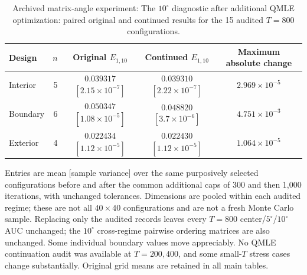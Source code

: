 \documentclass[12pt,letterpaper]{article}
\def\spacingset#1{\renewcommand{\baselinestretch}{#1}\small\normalsize}
\theoremstyle{plain}
\theoremstyle{definition}
\begin{document}
\begin{table}[p]
\begingroup
\spacingset{1.08}
\centering
\caption{Archived matrix-angle experiment: The $10^\circ$ diagnostic after additional QMLE optimization: paired original and continued results for the 15 audited $T=800$ configurations.}
\label{s23:tab:cap_iteration}
\small
\setlength{\tabcolsep}{6pt}
\renewcommand{\arraystretch}{1.10}
\begin{adjustbox}{max width=\linewidth}
\begin{tabular}{lrccc}
\toprule
Design & $n$ & Original $E_{1,10}$ & Continued $E_{1,10}$ & Maximum absolute change\\
\midrule
Interior & 5 & \shortstack{$0.039317$\\{\scriptsize$[2.15\times10^{-7}]$}} & \shortstack{$0.039310$\\{\scriptsize$[2.22\times10^{-7}]$}} & $2.969\times10^{-5}$\\
Boundary & 6 & \shortstack{$0.050347$\\{\scriptsize$[1.08\times10^{-5}]$}} & \shortstack{$0.048820$\\{\scriptsize$[3.7\times10^{-6}]$}} & $4.751\times10^{-3}$\\
Exterior & 4 & \shortstack{$0.022434$\\{\scriptsize$[1.12\times10^{-5}]$}} & \shortstack{$0.022430$\\{\scriptsize$[1.12\times10^{-5}]$}} & $1.064\times10^{-5}$\\
\bottomrule
\end{tabular}
\end{adjustbox}
\par\medskip
\begin{minipage}{0.96\linewidth}\footnotesize
Entries are mean [sample variance] over the same purposively selected configurations before and after the common additional caps of 300 and then 1,000 iterations, with unchanged tolerances. Dimensions are pooled within each audited regime; these are not all $40\times40$ configurations and are not a fresh Monte Carlo sample. Replacing only the audited records leaves every $T=800$ center/$5^\circ$/$10^\circ$ AUC unchanged; the $10^\circ$ cross-regime pairwise ordering matrices are also unchanged. Some individual boundary values move appreciably. No QMLE continuation audit was available at $T=200,400$, and some small-$T$ stress cases change substantially. Original grid means are retained in all main tables.
\end{minipage}
\endgroup
\end{table}
\end{document}
